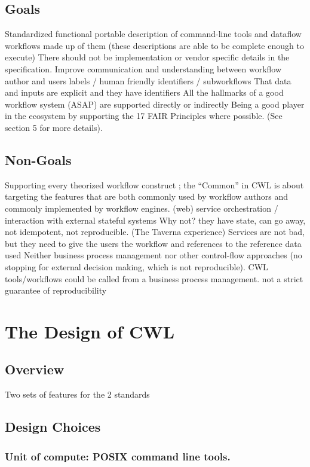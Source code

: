 \subsection{Goals}
Standardized functional portable description of command-line tools and dataflow workflows made up of them
(these descriptions are able to be complete enough to execute)
There should not be implementation or vendor specific details in the specification.
Improve communication and understanding between workflow author and users labels / human friendly identifiers / subworkflows
That data and inputs are explicit and they have identifiers
All the hallmarks of a good workflow system (ASAP) are supported directly or indirectly
Being a good player in the ecosystem by supporting the 17 FAIR Principles where possible. (See section 5 for more details).

\subsection{Non-Goals}
Supporting every theorized workflow construct ; the “Common” in CWL is about targeting the features that are both commonly used by workflow authors and commonly implemented by workflow engines.
(web) service orchestration / interaction with external stateful systems 
Why not? they have state, can go away, not idempotent, not reproducible. (The Taverna experience) Services are not bad, but they need to give the users the workflow and references to the reference data used
Neither business process management nor other control-flow approaches
(no stopping for external decision making, which is not reproducible). CWL tools/workflows could be called from a business process management.
not a strict guarantee of reproducibility

\section{The Design of CWL}
\subsection{Overview}
Two sets of features for the 2 standards
\subsection{Design Choices}
\subsubsection{Unit of compute: POSIX command line tools.}

